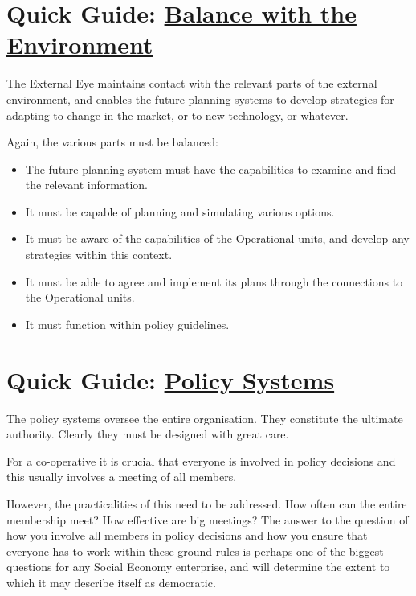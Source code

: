 \section*{Quick Guide: \href{https://vsmg.lrc.org.uk/7envtbal.html}{Balance with the Environment}}
The External Eye maintains contact with the relevant parts of the external environment, and enables the future planning systems to develop strategies for adapting to change in the market, or to new technology, or whatever.

Again, the various parts must be balanced:

\begin{itemize}
  \item The future planning system must have the capabilities to examine and find the relevant information.

  \item It must be capable of planning and simulating various options.

  \item It must be aware of the capabilities of the Operational units, and develop any strategies within this context.

  \item It must be able to agree and implement its plans through the connections to the Operational units.

  \item It must function within policy guidelines.

\end{itemize}

\section*{Quick Guide: \href{https://vsmg.lrc.org.uk/8psysdes.html}{Policy Systems}}
The policy systems oversee the entire organisation. They constitute the ultimate authority. Clearly they must be designed with great care.

For a co-operative it is crucial that everyone is involved in policy decisions and this usually involves a meeting of all members.

However, the practicalities of this need to be addressed. How often can the entire membership meet? How effective are big meetings? The answer to the question of how you involve all members in policy decisions and how you ensure that everyone has to work within these ground rules is perhaps one of the biggest questions for any Social Economy enterprise, and will determine the extent to which it may describe itself as democratic.

